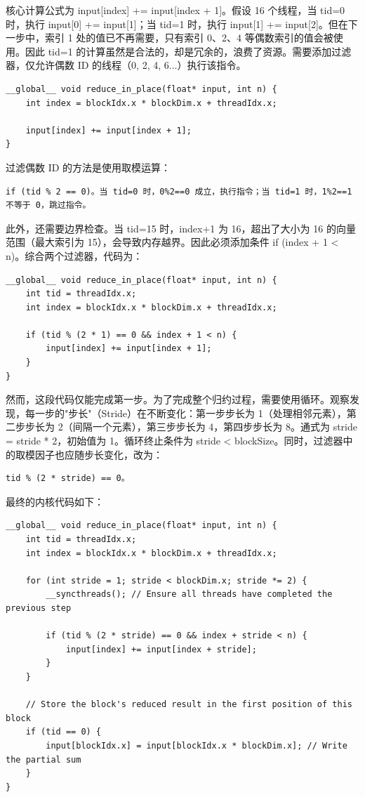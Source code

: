 核心计算公式为 input[index] += input[index + 1]。假设 16 个线程，当 tid=0 时，执行 input[0] += input[1]；当 tid=1 时，执行 input[1] += input[2]。但在下一步中，索引 1 处的值已不再需要，只有索引 0、2、4 等偶数索引的值会被使用。因此 tid=1 的计算虽然是合法的，却是冗余的，浪费了资源。需要添加过滤器，仅允许偶数 ID 的线程（0, 2, 4, 6...）执行该指令。

\begin{lstlisting}
__global__ void reduce_in_place(float* input, int n) {
    int index = blockIdx.x * blockDim.x + threadIdx.x;

    input[index] += input[index + 1];
}
\end{lstlisting}

过滤偶数 ID 的方法是使用取模运算：

\begin{lstlisting}
if (tid % 2 == 0)。当 tid=0 时，0%2==0 成立，执行指令；当 tid=1 时，1%2==1 不等于 0，跳过指令。
\end{lstlisting}

此外，还需要边界检查。当 tid=15 时，index+1 为 16，超出了大小为 16 的向量范围（最大索引为 15），会导致内存越界。因此必须添加条件 if (index + 1 < n)。综合两个过滤器，代码为：

\begin{lstlisting}
__global__ void reduce_in_place(float* input, int n) {
    int tid = threadIdx.x;
    int index = blockIdx.x * blockDim.x + threadIdx.x;

    if (tid % (2 * 1) == 0 && index + 1 < n) {
        input[index] += input[index + 1];
    }
}
\end{lstlisting}

然而，这段代码仅能完成第一步。为了完成整个归约过程，需要使用循环。观察发现，每一步的"步长"（Stride）在不断变化：第一步步长为 1（处理相邻元素），第二步步长为 2（间隔一个元素），第三步步长为 4，第四步步长为 8。通式为 stride = stride * 2，初始值为 1。循环终止条件为 stride < blockSize。同时，过滤器中的取模因子也应随步长变化，改为：

\begin{lstlisting}
tid % (2 * stride) == 0。
\end{lstlisting}

最终的内核代码如下：

\begin{lstlisting}
__global__ void reduce_in_place(float* input, int n) {
    int tid = threadIdx.x;
    int index = blockIdx.x * blockDim.x + threadIdx.x;

    for (int stride = 1; stride < blockDim.x; stride *= 2) {
        __syncthreads(); // Ensure all threads have completed the previous step

        if (tid % (2 * stride) == 0 && index + stride < n) {
            input[index] += input[index + stride];
        }
    }

    // Store the block's reduced result in the first position of this block
    if (tid == 0) {
        input[blockIdx.x] = input[blockIdx.x * blockDim.x]; // Write the partial sum
    }
}
\end{lstlisting}

